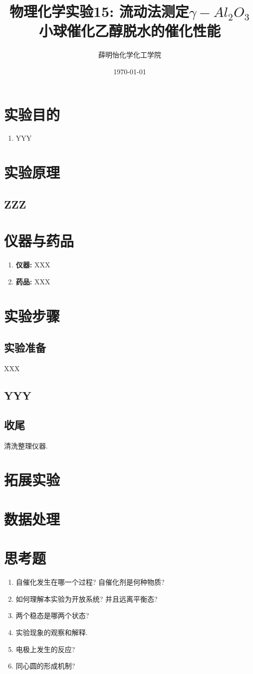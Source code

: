 \documentclass[a4paper]{article}
\title{物理化学实验15: 流动法测定$\gamma-Al_2O_3$小球催化乙醇脱水的催化性能}
\author{薛明怡\quad 151250177\quad 化学化工学院}
\date{\today}
\begin{document}
\maketitle
\section{实验目的}
\begin{enumerate}
\item YYY
\end{enumerate}
\section{实验原理}
\subsection{ZZZ}
\section{仪器与药品}
\begin{enumerate}
    \item \textbf{仪器:} XXX
    \item \textbf{药品:} XXX
\end{enumerate}
\section{实验步骤}
\subsection{实验准备}
XXX
\subsection{YYY}
\subsection{收尾}
清洗整理仪器.
\section{拓展实验}

\newpage
\section{数据处理}

\newpage
\section{思考题}
\begin{enumerate}
	\item 自催化发生在哪一个过程? 自催化剂是何种物质?
	\item 如何理解本实验为开放系统? 并且远离平衡态?
	\item 两个稳态是哪两个状态?
	\item 实验现象的观察和解释.
	\item 电极上发生的反应?
	\item 同心圆的形成机制?
\end{enumerate}
\newpage
\end{document}
